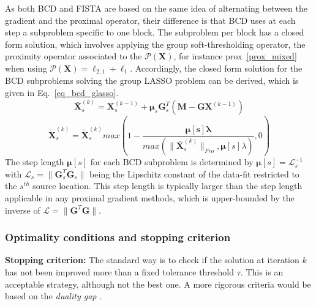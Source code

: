 As both BCD and FISTA are based on the same idea of alternating between the gradient and the proximal operator, their difference is that BCD uses at each step a subproblem specific to one block. The subproblem per block has a closed form solution, which involves applying the group soft-thresholding operator, the proximity operator associated to the $\mathcal{P}(\mathbf{X})$, for instance prox~\ref{prox_mixed} when using $\mathcal{P}(\mathbf{X}) = \ell_{2,1}+\ell_1$. Accordingly, the closed form solution for the BCD subproblems solving the group LASSO problem can be derived, which is given in Eq.~\ref{eq_bcd_glasso}.
\begin{equation*} \label{eq_bcd_glasso}
\bar{\mathbf{X}}_s^{(k)} = \mathbf{X}_s^{(k-1)}+\mathbf{\mu}_s\mathbf{G}^T_s(\mathbf{M} - \mathbf{GX}^{(k-1)})
\end{equation*}
\begin{equation}
\tilde{\mathbf{X}}_s^{(k)} = \tilde{\mathbf{X}}_s^{(k)}max(1-\frac{\mathbf{\mu[s]\lambda}}{max(\|\bar{\mathbf{X}}_s^{(k)}\|_{Fro}, \mathbf{\mu}[s]\lambda)}, 0)
\end{equation}
The step length $\mathbf{\mu}[s]$ for each BCD subproblem is determined by $\mathbf{\mu}[s]=\mathcal{L}_s^{-1}$ with $\mathcal{L}_s=\|\mathbf{G}_s^T\mathbf{G}_s\|$ being the Lipschitz constant of the data-fit restricted to the $s^{th}$ source location. This step length is typically larger than the step length applicable in any proximal gradient methods, which is upper-bounded by the inverse of $\mathcal{L} = \|\mathbf{G}^T\mathbf{G}\|$.

\subsubsection*{Optimality conditions and stopping criterion}
\textbf{Stopping criterion:} The standard way is to check if the solution at iteration $k$ has not been improved more than a fixed tolerance threshold $\tau$. This is an acceptable strategy, although not the best one. A more rigorous criteria would be based on the \textit{duality gap} \cite{boyd2004convex}.\\

